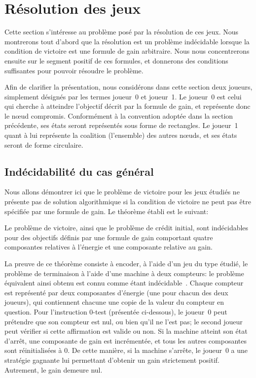 \section{Résolution des jeux}
\label{tj:sec:algo}

Cette section s'intéresse au problème posé par la résolution de ces jeux.
Nous montrerons tout d'abord que la résolution est un problème indécidable lorsque la condition de victoire est une formule de gain arbitraire.
Nous nous concentrerons ensuite sur le segment positif de ces formules, et donnerons des conditions suffisantes pour pouvoir résoudre le problème.

\newcommand\jo{joueur~0\xspace}
\newcommand\ji{joueur~1\xspace}
Afin de clarifier la présentation, nous considérons dans cette section deux joueurs, simplement désignés par les termes \jo et \ji.
Le \jo est celui qui cherche à atteindre l'objectif décrit par la formule de gain, et représente donc le nœud compromis.
Conformément à la convention adoptée dans la section précédente, ses états seront représentés sous forme de rectangles.
Le \ji quant à lui représente la coalition (l'ensemble) des autres nœuds, et ses états seront de forme circulaire.

\subsection{Indécidabilité du cas général}

Nous allons démontrer ici que le problème de victoire pour les jeux étudiés ne présente pas de solution algorithmique si la condition de victoire ne peut pas être spécifiée par une formule de gain.
Le théorème établi est le suivant:
\begin{theorem}
Le problème de victoire, ainsi que le problème de crédit initial, sont indécidables pour des objectifs définis par une formule de gain comportant quatre composantes relatives à l'énergie et une composante relative au gain.
\end{theorem}

La preuve de ce théorème consiste à encoder, à l'aide d'un jeu du type étudié, le problème de terminaison à l'aide d'une machine à deux compteurs: le problème équivalent ainsi obtenu est connu comme étant indécidable~\cite{minsky67}.
Chaque compteur est représenté par deux composantes d'énergie (une pour chacun des deux joueurs), qui contiennent chacune une copie de la valeur du compteur en question.
Pour l'instruction $0$-test (présentée ci-dessous), le \jo peut prétendre que son compteur est nul, ou bien qu'il ne l'est pas; le second joueur peut vérifier si cette affirmation est valide ou non.
Si la machine atteint son état d'arrêt, une composante de gain est incrémentée, et tous les autres composantes sont réinitialisées à $0$.
De cette manière, si la machine s'arrête, le \jo a une stratégie gagnante lui permettant d'obtenir un gain strictement positif.
Autrement, le gain demeure nul.

